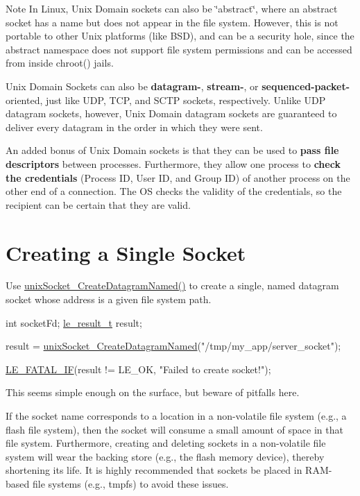 \begin{DoxyNote}{Note}
In Linux, Unix Domain sockets can also be \char`\"{}abstract\char`\"{}, where an abstract socket has a name but does not appear in the file system. However, this is not portable to other Unix platforms (like B\+SD), and can be a security hole, since the abstract namespace does not support file system permissions and can be accessed from inside chroot() jails.
\end{DoxyNote}
Unix Domain Sockets can also be {\bfseries datagram-\/}, {\bfseries stream-\/}, or {\bfseries  sequenced-\/packet-\/ } oriented, just like U\+DP, T\+CP, and S\+C\+TP sockets, respectively. Unlike U\+DP datagram sockets, however, Unix Domain datagram sockets are guaranteed to deliver every datagram in the order in which they were sent.

An added bonus of Unix Domain sockets is that they can be used to {\bfseries  pass file descriptors } between processes. Furthermore, they allow one process to {\bfseries  check the credentials } (Process ID, User ID, and Group ID) of another process on the other end of a connection. The OS checks the validity of the credentials, so the recipient can be certain that they are valid.\hypertarget{c_unixSockets_c_unixSocketsCreatingSingle}{}\section{Creating a Single Socket}\label{c_unixSockets_c_unixSocketsCreatingSingle}
Use \hyperlink{unix_socket_8h_af4c4d4e3521f296f0bfc4f398d3cafd9}{unix\+Socket\+\_\+\+Create\+Datagram\+Named()} to create a single, named datagram socket whose address is a given file system path.


\begin{DoxyCode}
\textcolor{keywordtype}{int} socketFd;
\hyperlink{le__basics_8h_a1cca095ed6ebab24b57a636382a6c86c}{le\_result\_t} result;

result = \hyperlink{unix_socket_8h_af4c4d4e3521f296f0bfc4f398d3cafd9}{unixSocket\_CreateDatagramNamed}(\textcolor{stringliteral}{"/tmp/my\_app/server\_socket"});

\hyperlink{le__log_8h_a7a3e66a87026cc9e57bcb748840ab41b}{LE\_FATAL\_IF}(result != LE\_OK, \textcolor{stringliteral}{"Failed to create socket!"});
\end{DoxyCode}


This seems simple enough on the surface, but beware of pitfalls here.

If the socket name corresponds to a location in a non-\/volatile file system (e.\+g., a flash file system), then the socket will consume a small amount of space in that file system. Furthermore, creating and deleting sockets in a non-\/volatile file system will wear the backing store (e.\+g., the flash memory device), thereby shortening its life. It is highly recommended that sockets be placed in R\+A\+M-\/based file systems (e.\+g., tmpfs) to avoid these issues.

